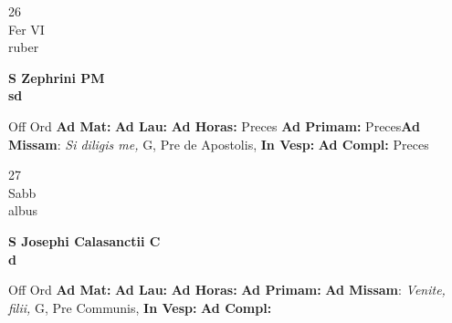 \documentclass[10pt, openany]{book}
\begin{document}
    \begin{center}
        \begin{minipage}{3.5in}
            \vspace{2em}
            \begin{minipage}{0.5in}
                {\Huge 26} \\
                {\normalsize Fer VI} \\
                {\normalsize ruber}
            \end{minipage}
            \begin{minipage}{3.0in}
                \textbf{ \large S Zephrini PM \\
                \textnormal{\normalsize sd}} \\ 
            \end{minipage}
            \begin{justify}Off Ord
                \textbf{Ad Mat: }
                \textbf{Ad Lau: }
                \textbf{Ad Horas: }Preces
                \textbf{Ad Primam: }Preces\textbf{Ad Missam}: \textit{Si diligis me,} G, Pre de Apostolis,  
                \textbf{In Vesp: }
                \textbf{Ad Compl: }Preces
            \end{justify}
        \end{minipage}
    \end{center}

    \begin{center}
        \begin{minipage}{3.5in}
            \vspace{2em}
            \begin{minipage}{0.5in}
                {\Huge 27} \\
                {\normalsize Sabb} \\
                {\normalsize albus}
            \end{minipage}
            \begin{minipage}{3.0in}
                \textbf{ \large S Josephi Calasanctii C \\
                \textnormal{\normalsize d}} \\ 
            \end{minipage}
            \begin{justify}Off Ord
                \textbf{Ad Mat: }
                \textbf{Ad Lau: }
                \textbf{Ad Horas: }
                \textbf{Ad Primam: }\textbf{Ad Missam}: \textit{Venite, filii,} G, Pre Communis,  
                \textbf{In Vesp: }
                \textbf{Ad Compl: }
            \end{justify}
        \end{minipage}
    \end{center}
\end{document}
